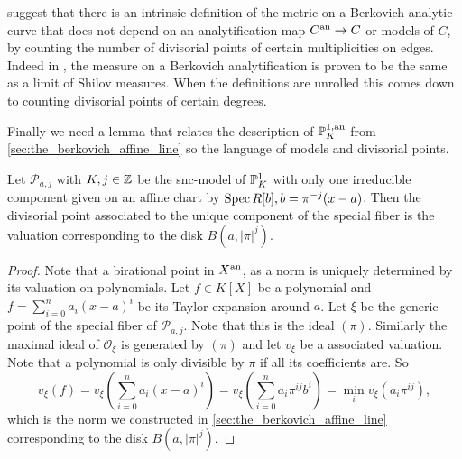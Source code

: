 \begin{remark}
	 suggest that there is an intrinsic definition of the metric on a Berkovich analytic curve that does not depend on an analytification map $ C{}^{\text{an}} \to C$ or models of $C$, by counting the number of divisorial points of certain multiplicities on edges. 
	Indeed in \cite{jonssonConvergenceAdicPluricanonical2020a}, the measure on a Berkovich analytification is proven to be the same as a limit of Shilov measures. When the definitions are unrolled this comes down to counting divisorial points of certain degrees. 
\end{remark}

Finally we need a lemma that relates the description of $\mathbb{P}^{1, \text{an}}_{K}$ from \cref{sec:the_berkovich_affine_line} so the language of models and divisorial points. 

\begin{lemma}\label{lem:model_disk_proj_line}
	Let $\mathscr P_{a,j} $ with $K, j \in \mathbb{Z}$ be the snc-model of $\mathscr {\mathbb{P}}_{K}^{1}$ with only one irreducible component given on an affine chart by $\operatorname{Spec} R[b], b = \pi^{-j}(x - a)$.
	Then the divisorial point associated to the unique component of the special fiber is the valuation corresponding to the disk $B(a, |\pi|^{j})$. 
\end{lemma}
\begin{proof}
	Note that a birational point in $X{}^{\text{an}}$, as a norm is uniquely determined by its valuation on polynomials. 
	Let $f \in K[X]$ be a polynomial and $f = \sum_{i = 0}^{n} a_i (x - a)^{i} $ be its Taylor expansion around $a$. 
	Let $\xi$ be the generic point of the special fiber of $\mathscr P_{a, j}$. 
	Note that this is the ideal $(\pi)$.
	Similarly the maximal ideal of $\mathcal{O}_{\xi}$ is generated by $(\pi)$ and let $v_{\xi}$ be a associated valuation.
	Note that a polynomial is only divisible by $\pi$ if all its coefficients are.
	So \[
		v_\xi(f) = v_\xi\left( \sum_{i = 0}^{n} a_{i} (x-a)^{i} \right) = v_\xi\left( \sum_{i = 0}^{n} a_i\pi^{ij}b^{i} \right) = \min_{i} v_{\xi}(a_i \pi^{ij}) 
	,\]
	which is the norm we constructed in \cref{sec:the_berkovich_affine_line} corresponding to the disk $B(a, |\pi|^{j})$.
\end{proof}


